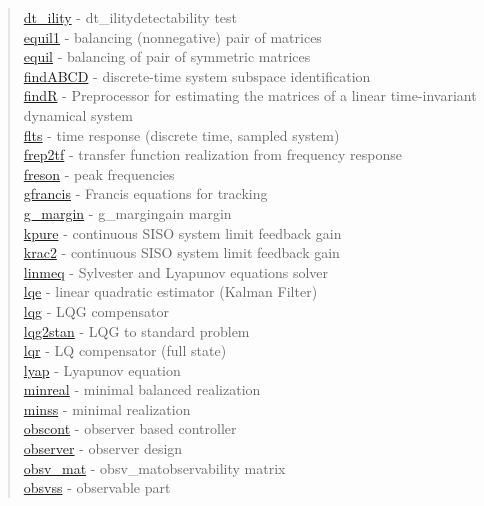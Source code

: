 \begin{quote}
\hyperlink{dt_ility}{dt\_ility} - {dt_ility}{detectability test} \\  
\hyperlink{equil1}{equil1} - {balancing (nonnegative) pair of matrices} \\  
\hyperlink{equil}{equil} - {balancing of pair of symmetric matrices} \\  
\hyperlink{findABCD}{findABCD} - {discrete-time system subspace identification} \\  
\hyperlink{findR}{findR} - {Preprocessor for estimating the matrices of a linear time-invariant dynamical system} \\  
\hyperlink{flts}{flts} - {time response (discrete time, sampled system)  } \\  
\hyperlink{frep2tf}{frep2tf} - {transfer function realization from frequency response} \\  
\hyperlink{freson}{freson} - {peak frequencies} \\  
\hyperlink{gfrancis}{gfrancis} - {Francis equations for tracking} \\  
\hyperlink{g_margin}{g\_margin} - {g_margin}{gain margin} \\  
\hyperlink{kpure}{kpure} - {continuous SISO system limit feedback gain} \\  
\hyperlink{krac2}{krac2} - {continuous SISO system limit feedback gain} \\  
\hyperlink{linmeq}{linmeq} - {Sylvester and Lyapunov equations solver} \\
\hyperlink{lqe}{lqe} - {linear quadratic estimator (Kalman Filter)} \\ 
\hyperlink{lqg}{lqg} - {LQG compensator} \\  
\hyperlink{lqg2stan}{lqg2stan} - {LQG to standard problem} \\  
\hyperlink{lqr}{lqr} - {LQ compensator (full state)} \\ %
\hyperlink{lyap}{lyap} - {Lyapunov equation} \\  
\hyperlink{minreal}{minreal} - {minimal balanced realization} \\  
\hyperlink{minss}{minss} - {minimal realization} \\  
\hyperlink{obscont}{obscont} - {observer based controller} \\  
\hyperlink{observer}{observer} - {observer design} \\  
\hyperlink{obsv_mat}{obsv\_mat} - {obsv_mat}{observability matrix} \\  
\hyperlink{obsvss}{obsvss} - {observable part} \\  

\end{quote}
